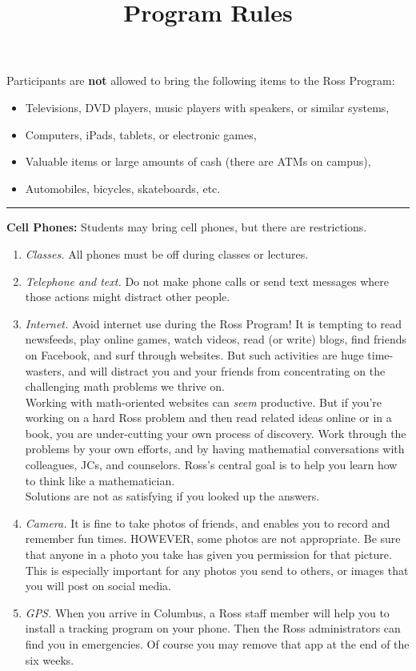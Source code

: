 \documentclass{ross}
\title{Program Rules}
\begin{document}
\maketitle
Participants are {\bf not} allowed to bring the following items to the Ross
Program:
\begin{itemize}
\item Televisions, DVD players, music players with speakers, or similar systems,
\item Computers, iPads, tablets, or electronic games,
\item Valuable items or large amounts of cash (there are ATMs on campus),
\item Automobiles, bicycles, skateboards, etc.
\end{itemize}



\bigskip\hrule
\textbf{Cell Phones:} Students may bring cell phones, but there are restrictions. 
\begin{enumerate}[label=(\roman*),itemsep=0.5em,topsep= 0em]

\item {\it Classes.}  All phones must be off during classes or lectures. 

\item {\it Telephone and text.}  Do not make phone calls or send text messages 
where those actions might distract other people.

\item {\it Internet.} Avoid internet use during the Ross Program!  It is tempting to read newsfeeds, play online games, watch videos, read (or write) blogs, find friends on Facebook, and surf through websites.  But such activities are huge time-wasters, and will distract you and your friends from concentrating on the challenging math problems we thrive on.  \\[5pt]
Working with math-oriented websites can {\it seem} productive. But if you're working on a hard Ross problem and then read related ideas online or in a book, you are under-cutting your own process of discovery. Work through the problems by your own efforts, and by having mathematial conversations with colleagues, JCs, and counselors.  Ross's central goal  is to help you learn how to think like a mathematician.\\
\hspace*{1cm} Solutions are not as satisfying if you looked up the answers.

\item {\it Camera.}  It is fine to take photos of friends, and enables you to record and remember fun times.  HOWEVER, some photos are not appropriate.  Be sure that anyone in a photo you take has given you permission for that picture.  This is especially important for any photos you send to others, or images that you will post on social media.  

\item{\it  GPS.}  When you arrive in Columbus, a Ross staff member will help you to install a tracking program on your phone.  Then the Ross administrators can find you in emergencies.  Of course you may remove that app at the end of the six weeks.
\end{enumerate}
\end{document}
